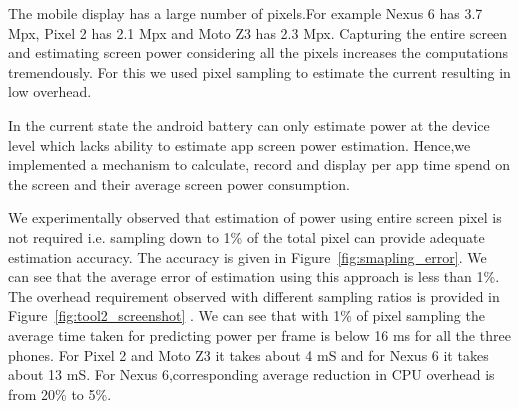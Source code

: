 
The mobile display has a large number of pixels.For example Nexus 6
has 3.7 Mpx, Pixel 2 has 2.1 Mpx and Moto Z3 has 2.3 Mpx.
Capturing the entire screen and estimating screen power considering all
the pixels increases the computations tremendously.
For this we used pixel sampling to estimate the current resulting in low
overhead.

In the current state the android battery can only estimate power at the device
level which lacks ability to estimate  app screen power estimation.
Hence,we  implemented a mechanism to calculate, record and display per
app time spend on the screen and their average screen power consumption.

We experimentally observed that estimation of power using entire
screen pixel is not required i.e.  sampling down to 1\% of the total
pixel can provide adequate estimation accuracy.  The accuracy is given
in Figure~\ref{fig:smapling_error}.  We can see that the average error
of estimation using this approach is less than 1\%.  The overhead
requirement observed with different sampling ratios is provided in
Figure~\ref{fig:tool2_screenshot} . We can see that with 1\% of pixel
sampling the average time taken for predicting power per frame is
below 16 ms for all the three phones. For Pixel 2 and Moto Z3 it takes
about 4 mS and for Nexus 6 it takes about 13 mS. For Nexus
6,corresponding average reduction in CPU overhead is from 20\% to 5\%.


